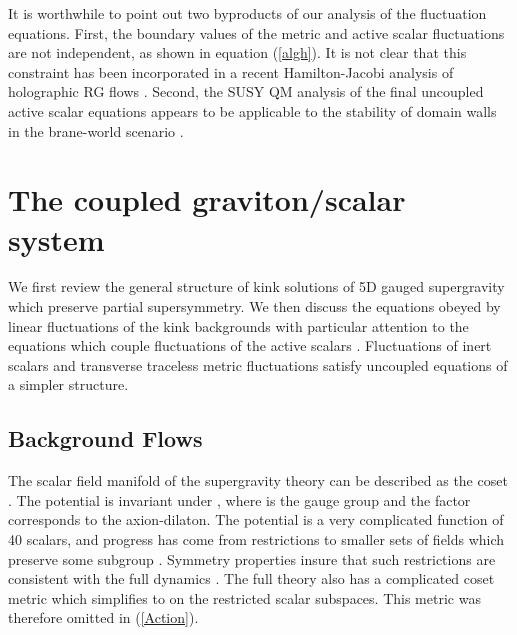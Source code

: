 \documentclass[a4paper,12pt]{article}
\def\varphit{\tilde{\varphi}}
\begin{document}
It is worthwhile to point out two byproducts of our analysis of the
fluctuation equations.  First, the boundary values of the metric and
active scalar fluctuations are not independent, as shown in equation
(\ref{algh}).  It is not clear that this constraint has been
incorporated in a recent Hamilton-Jacobi analysis of holographic RG
flows \cite{dbvv}.  Second, the SUSY QM analysis of the final
uncoupled active scalar equations appears to be applicable to the
stability of domain walls in the brane-world scenario \cite{rs1, rs2,
gw, dfgk}.


\section{The coupled graviton/scalar system}
\label{equations}



We first review the general structure of kink solutions of 5D \coordHE{} gauged supergravity which preserve partial supersymmetry. We
then discuss the equations obeyed by linear fluctuations of the kink
backgrounds with particular attention to the equations which couple
fluctuations \myHighlight{$\varphit^I(r,x)$}\coordHE{} of the active scalars \coordHE{}.
Fluctuations of inert scalars and transverse traceless metric
fluctuations satisfy uncoupled equations of a simpler structure.

\subsection{Background Flows}

The scalar field manifold of the supergravity theory can be described
as the coset \coordHE{}. The potential \coordHE{} is
invariant under \coordHE{}, where \coordHE{} is the gauge group and the \coordHE{} factor corresponds to
the axion-dilaton. The potential is a very complicated function of 40
scalars, and progress has come from restrictions to smaller sets of
fields which preserve some subgroup \coordHE{}. Symmetry
properties insure that such restrictions are consistent with the full
dynamics \cite{warnerold}.  The full theory also has a complicated
coset metric \coordHE{} which simplifies to \coordHE{} on
the restricted scalar subspaces. This metric was therefore omitted in
(\ref{Action}).
\end{document}
